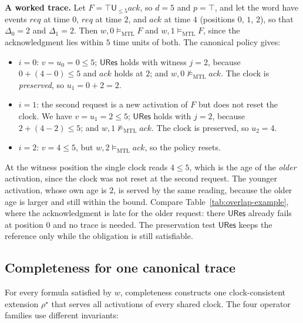 \documentclass[manuscript]{acmart}
\newcommand{\satM}{\models_{\mathrm{MTL}}}
\newcommand{\hUntil}{\mathbin{\widehat{\mathsf{U}}}}
\newcommand{\runinhead}[1]{\par\noindent\textbf{#1}\enspace}
\begin{document}
\runinhead{A worked trace.}
Let $F=\top\hUntil_{\le5}\mathit{ack}$, so $d=5$ and $p=\top$, and let the word
have events $\mathit{req}$ at time $0$, $\mathit{req}$ at time $2$, and
$\mathit{ack}$ at time $4$ (positions $0$, $1$, $2$), so that $\Delta_0=2$ and
$\Delta_1=2$. Then $w,0\satM F$ and $w,1\satM F$, since the acknowledgment lies
within $5$ time units of both. The canonical policy gives:
\begin{itemize}
  \item $i=0$: $v=u_0=0\le5$; $\mathsf{URes}$ holds with witness $j=2$, because
        $0+(4-0)\le5$ and $\mathit{ack}$ holds at $2$; and $w,0\not\satM\mathit{ack}$. The clock
        is \emph{preserved}, so $u_1=0+2=2$.
  \item $i=1$: the second request is a new activation of $F$ but does not reset
        the clock. We have $v=u_1=2\le5$; $\mathsf{URes}$ holds with $j=2$, because
        $2+(4-2)\le5$; and $w,1\not\satM\mathit{ack}$. The clock is preserved,
        so $u_2=4$.
  \item $i=2$: $v=4\le5$, but $w,2\satM\mathit{ack}$, so the policy resets.
\end{itemize}
At the witness position the single clock reads $4\le5$, which is the age of the
\emph{older} activation, since the clock was not reset at the second request.
The younger activation, whose own age is $2$, is served by the same reading,
because the older age is larger and still within the bound. Compare
Table~\ref{tab:overlap-example}, where the acknowledgment is late for the older
request: there $\mathsf{URes}$ already fails at position $0$ and no trace is
needed. The preservation test $\mathsf{URes}$ keeps the reference only while
the obligation is still satisfiable.

\subsection{Completeness for one canonical trace}
\label{subsec:primitive-completeness}
For every formula satisfied by $w$, completeness constructs one clock-consistent
extension $\rho^\star$ that serves all activations of every shared clock.
The four operator families use different invariants:
\end{document}
